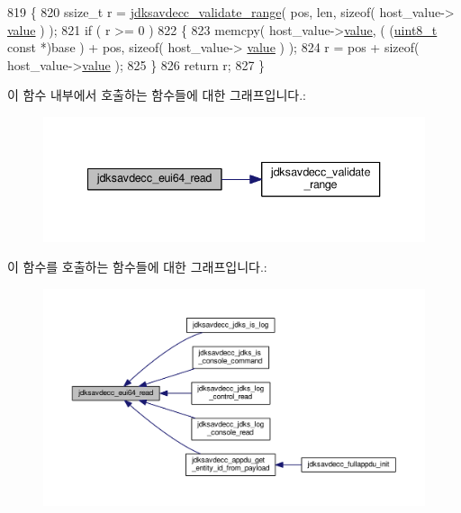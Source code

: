 \begin{DoxyCode}
819 \{
820     ssize\_t r = \hyperlink{group__util_ga9c02bdfe76c69163647c3196db7a73a1}{jdksavdecc\_validate\_range}( pos, len, \textcolor{keyword}{sizeof}( host\_value->
      \hyperlink{structjdksavdecc__eui64_ac7a8beb4da4fc8eb8acfec13711a134f}{value} ) );
821     \textcolor{keywordflow}{if} ( r >= 0 )
822     \{
823         memcpy( host\_value->\hyperlink{structjdksavdecc__eui64_ac7a8beb4da4fc8eb8acfec13711a134f}{value}, ( (\hyperlink{stdint_8h_aba7bc1797add20fe3efdf37ced1182c5}{uint8\_t} \textcolor{keyword}{const} *)base ) + pos, \textcolor{keyword}{sizeof}( host\_value->
      \hyperlink{structjdksavdecc__eui64_ac7a8beb4da4fc8eb8acfec13711a134f}{value} ) );
824         r = pos + \textcolor{keyword}{sizeof}( host\_value->\hyperlink{structjdksavdecc__eui64_ac7a8beb4da4fc8eb8acfec13711a134f}{value} );
825     \}
826     \textcolor{keywordflow}{return} r;
827 \}
\end{DoxyCode}


이 함수 내부에서 호출하는 함수들에 대한 그래프입니다.\+:
\nopagebreak
\begin{figure}[H]
\begin{center}
\leavevmode
\includegraphics[width=340pt]{group__eui64_ga7c7ee5c2d293106f4d997affcbc3ef15_cgraph}
\end{center}
\end{figure}




이 함수를 호출하는 함수들에 대한 그래프입니다.\+:
\nopagebreak
\begin{figure}[H]
\begin{center}
\leavevmode
\includegraphics[width=350pt]{group__eui64_ga7c7ee5c2d293106f4d997affcbc3ef15_icgraph}
\end{center}
\end{figure}


